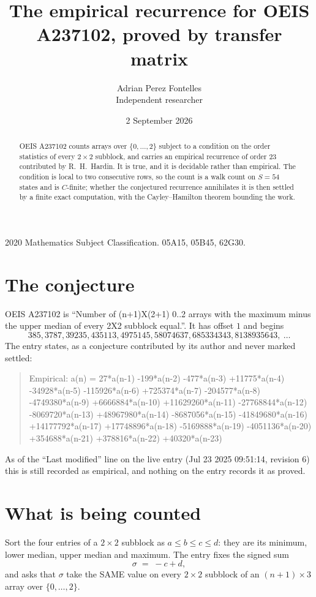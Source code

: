 \documentclass[11pt,a4paper]{article}
\title{The empirical recurrence for OEIS A237102, proved by transfer matrix}
\author{Adrian Perez Fontelles\\ \small Independent researcher}
\date{2 September 2026}
\theoremstyle{plain}
\theoremstyle{definition}
\begin{document}
\maketitle

\begin{abstract}
OEIS A237102 counts arrays over $\{0,\dots,2\}$ subject to a condition on the order
statistics of every $2\times2$ subblock, and carries an empirical recurrence of order
$23$ contributed by R.~H.~Hardin. It is true, and it is decidable rather than empirical.
The condition is local to two consecutive rows, so the count is a walk count on $S=54$
states and is $C$-finite; whether the conjectured recurrence annihilates it is then settled by
a finite exact computation, with the Cayley--Hamilton theorem bounding the work.
\end{abstract}

\noindent\small 2020 Mathematics Subject Classification. 05A15, 05B45, 62G30.\normalsize

\section{The conjecture}

OEIS A237102 is ``Number of (n+1)X(2+1) 0..2 arrays with the maximum minus the upper median of every 2X2 subblock equal.''. It has offset $1$ and begins
\[
385, 3787, 39235, 435113, 4975145, 58074637, 685334343, 8138935643,\ \dots
\]
The entry states, as a conjecture contributed by its author and never marked settled:
\begin{quote}
Empirical: a(n) = 27*a(n-1) -199*a(n-2) -477*a(n-3) +11775*a(n-4) -34928*a(n-5) -115926*a(n-6) +725374*a(n-7) -204577*a(n-8) -4749380*a(n-9) +6666884*a(n-10) +11629260*a(n-11) -27768844*a(n-12) -8069720*a(n-13) +48967980*a(n-14) -8687056*a(n-15) -41849680*a(n-16) +14177792*a(n-17) +17748896*a(n-18) -5169888*a(n-19) -4051136*a(n-20) +354688*a(n-21) +378816*a(n-22) +40320*a(n-23)
\end{quote}
As of the ``Last modified'' line on the live entry (Jul 23 2025 09:51:14, revision 6) this is still
recorded as empirical, and nothing on the entry records it as proved.

\section{What is being counted}

Sort the four entries of a $2\times2$ subblock as $a\le b\le c\le d$: they
are its minimum, lower median, upper median and maximum. The entry fixes the signed sum
\[
\sigma\;=\;-c+d,
\]
and asks that $\sigma$ take the SAME value on every $2\times2$ subblock of an
$(n+1)\times3$ array over $\{0,\dots,2\}$.
\end{document}
